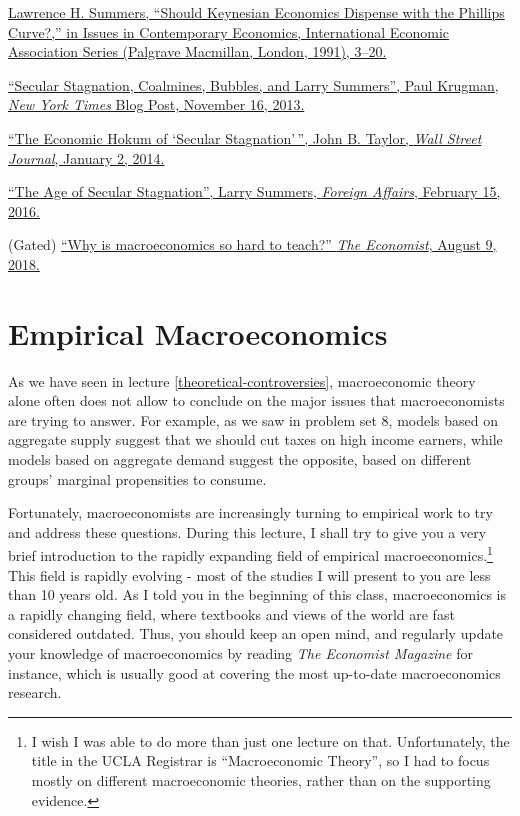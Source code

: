 \documentclass[]{book}
\let\rmarkdownfootnote\footnote%
\def\footnote{\protect\rmarkdownfootnote}
\begin{document}
\href{bib/Summers1991.pdf}{Lawrence H. Summers, ``Should Keynesian
Economics Dispense with the Phillips Curve?,'' in Issues in Contemporary
Economics, International Economic Association Series (Palgrave
Macmillan, London, 1991), 3--20.}

\href{https://krugman.blogs.nytimes.com/2013/11/16/secular-stagnation-coalmines-bubbles-and-larry-summers/}{``Secular
Stagnation, Coalmines, Bubbles, and Larry Summers'', Paul Krugman,
\emph{New York Times} Blog Post, November 16, 2013.}

\href{https://search.proquest.com/docview/1473347330/6C9B371C00BE4C7BPQ/1?accountid=14512}{``The
Economic Hokum of `Secular Stagnation'\,'', John B. Taylor, \emph{Wall
Street Journal}, January 2, 2014.}

\href{http://larrysummers.com/2016/02/17/the-age-of-secular-stagnation/}{``The
Age of Secular Stagnation'', Larry Summers, \emph{Foreign Affairs},
February 15, 2016.}

(Gated)
\href{https://www.economist.com/finance-and-economics/2018/08/09/why-is-macroeconomics-so-hard-to-teach}{``Why
is macroeconomics so hard to teach?'' \emph{The Economist}, August 9,
2018.}

\chapter{Empirical Macroeconomics}\label{empirical-macro}

As we have seen in lecture \ref{theoretical-controversies},
macroeconomic theory alone often does not allow to conclude on the major
issues that macroeconomists are trying to answer. For example, as we saw
in problem set 8, models based on aggregate supply suggest that we
should cut taxes on high income earners, while models based on aggregate
demand suggest the opposite, based on different groups' marginal
propensities to consume.

Fortunately, macroeconomists are increasingly turning to empirical work
to try and address these questions. During this lecture, I shall try to
give you a very brief introduction to the rapidly expanding field of
empirical macroeconomics.\footnote{I wish I was able to do more than
  just one lecture on that. Unfortunately, the title in the UCLA
  Registrar is ``Macroeconomic Theory'', so I had to focus mostly on
  different macroeconomic theories, rather than on the supporting
  evidence.} This field is rapidly evolving - most of the studies I will
present to you are less than 10 years old. As I told you in the
beginning of this class, macroeconomics is a rapidly changing field,
where textbooks and views of the world are fast considered outdated.
Thus, you should keep an open mind, and regularly update your knowledge
of macroeconomics by reading \emph{The Economist Magazine} for instance,
which is usually good at covering the most up-to-date macroeconomics
research.
\end{document}
